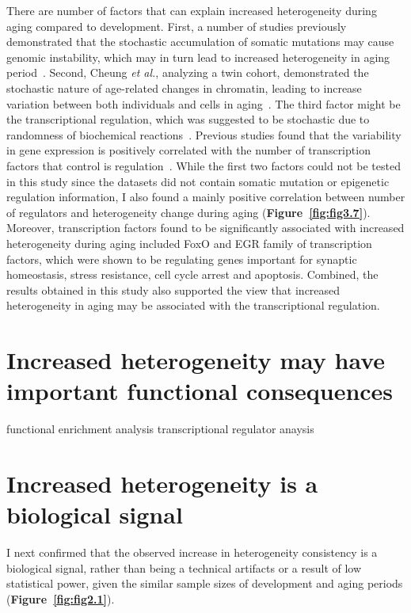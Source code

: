 There are number of factors that can explain increased heterogeneity during aging compared to development.
First, a number of studies previously demonstrated that the stochastic accumulation of somatic mutations may cause genomic instability,
which may in turn lead to increased heterogeneity in aging period~\cite{Lu2004, Vijg2004, Lodato2018, Lombard2005}.
Second, Cheung \textit{et al.}, analyzing a twin cohort, demonstrated the stochastic nature of age-related changes in chromatin,
leading to increase variation between both individuals and cells in aging~\cite{Cheung2018}.
The third factor might be the transcriptional regulation, which was suggested to be stochastic due to randomness of biochemical reactions~\cite{Maheshri2007, Barroso2018}.
Previous studies found that the variability in gene expression is positively correlated with the number of transcription factors that control is regulation~\cite{Barroso2018, Sharon2014}.
While the first two factors could not be tested in this study since the datasets did not contain somatic mutation or epigenetic regulation information, 
I also found a mainly positive correlation between number of regulators and heterogeneity change during aging (\textbf{Figure~\ref{fig:fig3.7}}).
Moreover, transcription factors found to be significantly associated with increased heterogeneity during aging included FoxO and EGR family of transcription factors, 
which were shown to be regulating genes important for synaptic homeostasis, stress resistance, cell cycle arrest and apoptosis.
Combined, the results obtained in this study also supported the view that increased heterogeneity in aging may be associated with the transcriptional regulation.

\section{Increased heterogeneity may have important functional consequences}
functional enrichment analysis
transcriptional regulator anaysis

\section{Increased heterogeneity is a biological signal}
I next confirmed that the observed increase in heterogeneity consistency is a biological signal, rather than being a technical artifacts or a result of low statistical power, 
given the similar sample sizes of development and aging periods (\textbf{Figure~\ref{fig:fig2.1}}).

